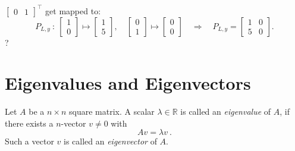 \begin{exercise}
\begin{enumerate}[(i)]
{	$\begin{bmatrix} 0 & 1 \end{bmatrix}^\top$ get mapped to: 
	\[ P_{L,y} \: : \: \begin{bmatrix} 1 \\ 0 \end{bmatrix}
	\mapsto \begin{bmatrix} 1 \\ 5 \end{bmatrix}, \quad 
	\begin{bmatrix} 0 \\ 1 \end{bmatrix}
	\mapsto \begin{bmatrix} 0 \\ 0 \end{bmatrix} 
	\quad \Rightarrow \quad 
	P_{L,y} = \begin{bmatrix} 1 & 0 \\ 5 & 0 \end{bmatrix}. \]}?
\end{enumerate}
\end{exercise}


\section{Eigenvalues and Eigenvectors}

\begin{definition}
	Let $A$ be a $n \times n$ square matrix. A scalar $\lambda \in \mathbb{R}$ is called an \emph{eigenvalue} of $A$, if there exists a $n$-vector $v\not=0$ with 
	\[ Av = \lambda v \:. \]
	Such a vector $v$ is called an \emph{eigenvector} of $A$.
\end{definition}

